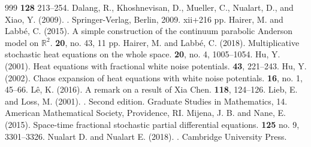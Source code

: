 \documentclass[a4paper,11pt]{article}
\numberwithin{equation}{section}
\theoremstyle{plain}
\theoremstyle{definition}
\newcommand{\R}{\mathbb{R}}
\numberwithin{NQ}{section}
\numberwithin{LQ}{section}
\numberwithin{ZQ}{section}
\begin{document}
\begin{thebibliography}{999}
	 {\bf 128} 213--254.
	Dalang, R., Khoshnevisan, D., Mueller, C., Nualart, D., and Xiao, Y. (2009).
	.
	\newblock Springer-Verlag, Berlin, 2009. xii+216 pp.
	Hairer, M. and Labb\'e, C. (2015).
	\newblock A simple construction of the continuum parabolic Anderson model on $\R^2$.
	 \textbf{20}, no. 43, 11 pp.
	Hairer, M. and Labb\'e, C. (2018).
	\newblock Multiplicative stochastic heat equations on the whole space.
	 \textbf{20}, no. 4, 1005--1054.
	Hu, Y. (2001).
	\newblock Heat equations with fractional white noise potentials.
	 \textbf{43}, 221--243.
	Hu, Y. (2002).
	\newblock Chaos expansion of heat equations with white noise potentials.
	 \textbf{16}, no. 1, 45--66.
	L\^e, K. (2016).
	\newblock A remark on a result of Xia Chen.
	 {\bf 118}, 124--126.
	Lieb, E. and Loss, M. (2001).
	. Second edition.
	\newblock Graduate Studies in Mathematics, 14.
	\newblock American Mathematical Society, Providence, RI.
	Mijena, J. B. and Nane, E. (2015).
	\newblock Space-time fractional stochastic partial differential equations.
	 \textbf{125} no. 9, 3301--3326.
	Nualart D. and Nualart E. (2018).
	.
	\newblock Cambridge University Press.
\end{thebibliography}
\end{document}
